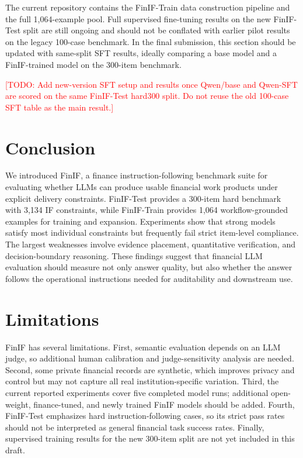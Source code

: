 \documentclass[11pt]{article}
\newcommand{\todo}[1]{\textcolor{red}{[TODO: #1]}}
\begin{document}
The current repository contains the FinIF-Train data construction pipeline and the full 1,064-example pool. Full supervised fine-tuning results on the new FinIF-Test split are still ongoing and should not be conflated with earlier pilot results on the legacy 100-case benchmark. In the final submission, this section should be updated with same-split SFT results, ideally comparing a base model and a FinIF-trained model on the 300-item benchmark.

\todo{Add new-version SFT setup and results once Qwen/base and Qwen-SFT are scored on the same FinIF-Test hard300 split. Do not reuse the old 100-case SFT table as the main result.}

\section{Conclusion}

We introduced FinIF, a finance instruction-following benchmark suite for evaluating whether LLMs can produce usable financial work products under explicit delivery constraints. FinIF-Test provides a 300-item hard benchmark with 3,134 IF constraints, while FinIF-Train provides 1,064 workflow-grounded examples for training and expansion. Experiments show that strong models satisfy most individual constraints but frequently fail strict item-level compliance. The largest weaknesses involve evidence placement, quantitative verification, and decision-boundary reasoning. These findings suggest that financial LLM evaluation should measure not only answer quality, but also whether the answer follows the operational instructions needed for auditability and downstream use.

\section{Limitations}

FinIF has several limitations. First, semantic evaluation depends on an LLM judge, so additional human calibration and judge-sensitivity analysis are needed. Second, some private financial records are synthetic, which improves privacy and control but may not capture all real institution-specific variation. Third, the current reported experiments cover five completed model runs; additional open-weight, finance-tuned, and newly trained FinIF models should be added. Fourth, FinIF-Test emphasizes hard instruction-following cases, so its strict pass rates should not be interpreted as general financial task success rates. Finally, supervised training results for the new 300-item split are not yet included in this draft.
\end{document}
